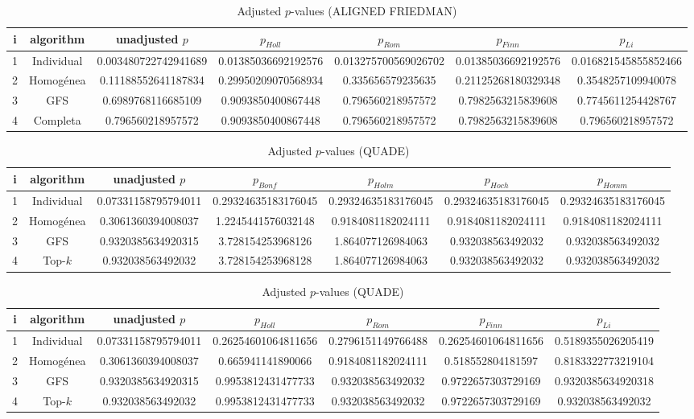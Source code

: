 \documentclass[a4paper,10pt]{article}
\begin{document}
\begin{landscape}
\begin{table}[!htp]
\centering\scriptsize
\caption{Adjusted $p$-values (ALIGNED FRIEDMAN)}
\begin{tabular}{ccccccc}
i&algorithm&unadjusted $p$&$p_{Holl}$&$p_{Rom}$&$p_{Finn}$&$p_{Li}$\\
\hline
1&Individual&0.003480722742941689&0.01385036692192576&0.013275700569026702&0.01385036692192576&0.016821545855852466\\
2&Homogénea&0.11188552641187834&0.29950209070568934&0.335656579235635&0.21125268180329348&0.3548257109940078\\
3&GFS&0.6989768116685109&0.9093850400867448&0.796560218957572&0.7982563215839608&0.7745611254428767\\
4&Completa&0.796560218957572&0.9093850400867448&0.796560218957572&0.7982563215839608&0.796560218957572\\
\hline
\end{tabular}
\end{table}


\newpage

\begin{table}[!htp]
\centering\scriptsize
\caption{Adjusted $p$-values (QUADE)}
\begin{tabular}{ccccccc}
i&algorithm&unadjusted $p$&$p_{Bonf}$&$p_{Holm}$&$p_{Hoch}$&$p_{Homm}$\\
\hline
1&Individual&0.07331158795794011&0.29324635183176045&0.29324635183176045&0.29324635183176045&0.29324635183176045\\
2&Homogénea&0.3061360394008037&1.2245441576032148&0.9184081182024111&0.9184081182024111&0.9184081182024111\\
3&GFS&0.9320385634920315&3.728154253968126&1.864077126984063&0.932038563492032&0.932038563492032\\
4&Top-$k$&0.932038563492032&3.728154253968128&1.864077126984063&0.932038563492032&0.932038563492032\\
\hline
\end{tabular}
\end{table}

\begin{table}[!htp]
\centering\scriptsize
\caption{Adjusted $p$-values (QUADE)}
\begin{tabular}{ccccccc}
i&algorithm&unadjusted $p$&$p_{Holl}$&$p_{Rom}$&$p_{Finn}$&$p_{Li}$\\
\hline
1&Individual&0.07331158795794011&0.26254601064811656&0.2796151149766488&0.26254601064811656&0.5189355026205419\\
2&Homogénea&0.3061360394008037&0.665941141890066&0.9184081182024111&0.518552804181597&0.8183322773219104\\
3&GFS&0.9320385634920315&0.9953812431477733&0.932038563492032&0.9722657303729169&0.9320385634920318\\
4&Top-$k$&0.932038563492032&0.9953812431477733&0.932038563492032&0.9722657303729169&0.932038563492032\\
\hline
\end{tabular}
\end{table}

\end{landscape}
\end{document}
